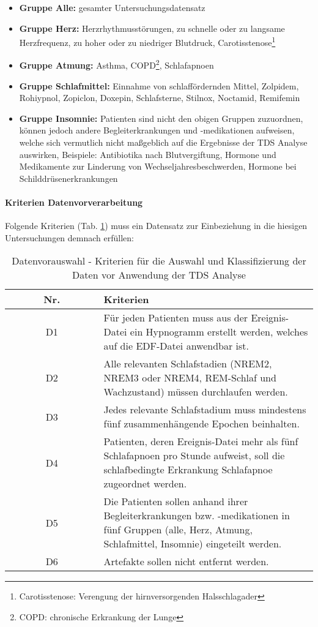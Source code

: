 \begin{itemize}
\item \textbf{Gruppe Alle:} gesamter Untersuchungsdatensatz
\item \textbf{Gruppe Herz:} Herzrhythmusstörungen, zu schnelle oder zu langsame Herzfrequenz, zu hoher oder zu niedriger Blutdruck, Carotisstenose\footnote{Carotisstenose: Verengung der hirnversorgenden Halsschlagader}
\item \textbf{Gruppe Atmung:} Asthma, COPD\footnote{COPD: chronische Erkrankung der Lunge}, Schlafapnoen
\item \textbf{Gruppe Schlafmittel:} Einnahme von schlaffördernden Mittel, Zolpidem, Rohiypnol, Zopiclon, Doxepin, Schlafsterne, Stilnox, Noctamid, Remifemin
\item \textbf{Gruppe Insomnie:} Patienten sind nicht den obigen Gruppen zuzuordnen, können jedoch andere Begleiterkrankungen und -medikationen aufweisen, welche sich vermutlich nicht maßgeblich auf die Ergebnisse der \acs{TDS} Analyse auswirken, Beispiele: Antibiotika nach Blutvergiftung, Hormone und Medikamente zur Linderung von Wechseljahresbeschwerden, Hormone bei Schilddrüsenerkrankungen
\end{itemize}

\paragraph{Kriterien Datenvorverarbeitung} Folgende Kriterien (Tab. \ref{tab:Datenvorauswahl}) muss ein Datensatz zur Einbeziehung in die hiesigen Untersuchungen demnach erfüllen:

\begin{table}[H] 
\begin{tabularx}{\textwidth}{cX}
\toprule
\multicolumn{1}{c}{\textbf{~~~~~~Nr.~~~~~~}} & \multicolumn{1}{l}{\textbf{Kriterien}}\\
\midrule 
D1 & Für jeden Patienten muss aus der Ereignis-Datei ein Hypnogramm erstellt werden, welches auf die \acs{EDF}-Datei anwendbar ist.\\
D2 & Alle relevanten Schlafstadien (\acs{NREM}2, \acs{NREM}3 oder \acs{NREM}4, \acs{REM}-Schlaf und Wachzustand) müssen durchlaufen werden.\\
D3 & Jedes relevante Schlafstadium muss mindestens fünf zusammenhängende Epochen beinhalten.\\
D4 & Patienten, deren Ereignis-Datei mehr als fünf Schlafapnoen pro Stunde aufweist, soll die schlafbedingte Erkrankung Schlafapnoe zugeordnet werden.\\
D5 & Die Patienten sollen anhand ihrer Begleiterkrankungen bzw. -medikationen in fünf Gruppen (alle, Herz, Atmung, Schlafmittel, Insomnie) eingeteilt werden.\\
D6 & Artefakte sollen nicht entfernt werden.\\
\bottomrule
\end{tabularx}
\caption[Datenvorauswahl - Kriterien]{Datenvorauswahl - Kriterien für die Auswahl und Klassifizierung der Daten vor Anwendung der \acs{TDS} Analyse}
\label{tab:Datenvorauswahl}
\end{table}

